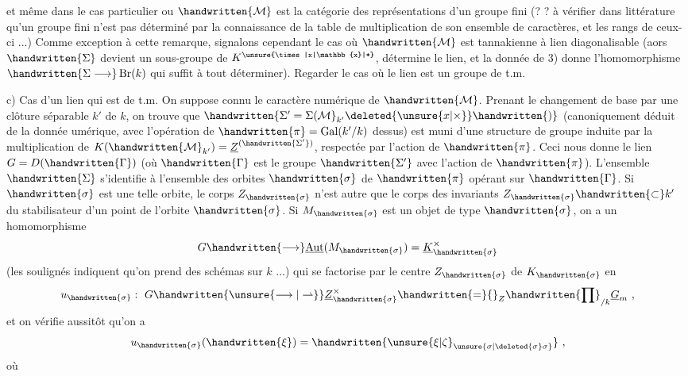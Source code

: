 et même dans le cas particulier ou $\handwritten{\mathcal{M}}$ est la catégorie des représentations d'un groupe fini (? ? à vérifier dans littérature qu'un groupe fini n'est pas déterminé par la connaissance de la table de multiplication de  son ensemble de caractères, et les rangs de ceux-ci ...) Comme exception à cette remarque, signalons cependant le cas où $\handwritten{\mathcal{M}}$ est tannakienne à lien diagonalisable (aors $\handwritten{\Sigma}$ devient un sous-groupe de $K^{\unsure{\times|x|\mathbb{x}|*}}$,  détermine le lien, et la donnée de 3) donne l'homomorphisme $\handwritten{\Sigma\longrightarrow}\operatorname{Br}(k)$ qui suffit à tout déterminer). Regarder le cas où le lien est un groupe de t.m.

c) Cas d'un lien qui est de t.m. On suppose connu le caractère numérique  de $\handwritten{\mathcal{M}}$. Prenant le changement de base par une clôture séparable $k'$ de $k$, on trouve que $\handwritten{\Sigma'=\Sigma(\mathcal{M}}_{k'}\deleted{\unsure{x|\times}}\handwritten{)}$ (canoniquement déduit de la donnée umérique, avec l'opération de $\handwritten{\pi}=\operatorname{Gal}(k'/k)$ dessus) est muni d'une structure de groupe induite par la multiplication de $K(\handwritten{\mathcal{M}}_{k'})=\underline{Z}^{(\handwritten{\Sigma'})}$,  respectée par l'action de $\handwritten{\pi}$. Ceci nous donne le lien $G=D(\handwritten{\Gamma})$ (où $\handwritten{\Gamma}$ est le groupe $\handwritten{\Sigma'}$ avec l'action de $\handwritten{\pi}$). L'ensemble $\handwritten{\Sigma}$ s'identifie à l'ensemble des orbites $\handwritten{\sigma}$ de $\handwritten{\pi}$ opérant sur $\handwritten{\Gamma}$. Si $\handwritten{\sigma}$ est une telle orbite, le corps $Z_{\handwritten{\sigma}}$ n'est autre que le corps des invariants $Z_{\handwritten{\sigma}}\handwritten{\subset}k'$ du stabilisateur d'un point de l'orbite $\handwritten{\sigma}$. Si $M_{\handwritten{\sigma}}$ est un objet de type $\handwritten{\sigma}$, on a un homomorphisme
\[
G\handwritten{\longrightarrow}\underline{\operatorname{Aut}}(M_{\handwritten{\sigma}})=\underline{K}_{\handwritten{\sigma}}^\times
\]
(les soulignés indiquent qu'on prend des schémas sur $k$ ...) qui se factorise par le centre $Z_{\handwritten{\sigma}}$ de $K_{\handwritten{\sigma}}$ en
\[
u_{\handwritten{\sigma}}:\ G\handwritten{\unsure{\longrightarrow|\rightharpoonup}}\underline{Z}_{\handwritten{\sigma}}^\times\handwritten{=}{}_{Z}\handwritten{\prod}_{/k}\underline{G}_m\ ,
\]
et on vérifie aussitôt qu'on a
\[
u_{\handwritten{\sigma}}(\handwritten{\xi})=\handwritten{\unsure{\xi|\zeta}_{\unsure{\sigma|\deleted{\sigma}\sigma}}}\ ,
\]
où
